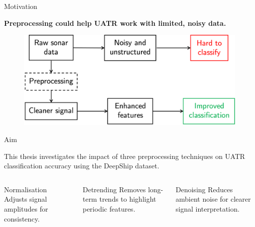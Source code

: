 \documentclass[]{beamer}
\begin{document}
\begin{frame}{Motivation}

    \begin{center}
    \textbf{\Large Preprocessing could help UATR work with limited, noisy data.}
    \end{center}

    \vspace{0.5cm}
    
    \begin{figure}
        \centering
        \includegraphics[width=0.8\linewidth]{img/methodology_flowchart_3.png}
    \end{figure}
\end{frame}

\begin{frame}{Aim}

    This thesis investigates the impact of three preprocessing techniques on UATR classification accuracy using the DeepShip dataset.

    \vspace{0.5cm}

    \begin{columns}
        \begin{column}{0.33\textwidth}
            \begin{block}{Normalisation}
                Adjusts signal amplitudes for consistency.
            \end{block}
        \end{column}
        \begin{column}{0.33\textwidth}
            \begin{block}{Detrending}
                Removes long-term trends to highlight periodic features.
            \end{block}
        \end{column}
        \begin{column}{0.33\textwidth}
            \begin{block}{Denoising}
                Reduces ambient noise for clearer signal interpretation.
            \end{block}
        \end{column}
    \end{columns}

\end{frame}
\end{document}
